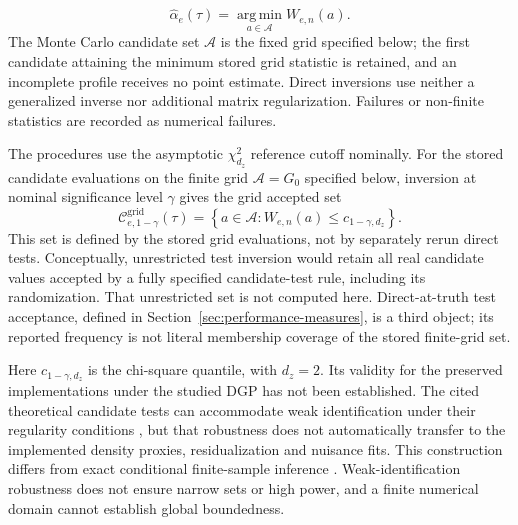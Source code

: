 \begin{equation}
    \widehat\alpha_e(\tau)
    =
    \operatorname*{arg\,min}_{a\in\mathcal A}W_{e,n}(a).
    \label{eq:gmm-point-estimator}
\end{equation}
The Monte Carlo candidate set $\mathcal A$ is the fixed grid specified below; the first candidate attaining the minimum stored grid statistic is retained, and an incomplete profile receives no point estimate. Direct inversions use neither a generalized inverse nor additional matrix regularization. Failures or non-finite statistics are recorded as numerical failures.

The procedures use the asymptotic $\chi^2_{d_z}$ reference cutoff nominally. For the stored candidate evaluations on the finite grid $\mathcal A=G_0$ specified below, inversion at nominal significance level $\gamma$ gives the grid accepted set
\begin{equation}
    \mathcal C^{\mathrm{grid}}_{e,1-\gamma}(\tau)
    =
    \left\{
        a\in\mathcal A:
        W_{e,n}(a)\leq c_{1-\gamma,d_z}
    \right\}.
    \label{eq:robust-confidence-region}
\end{equation}
This set is defined by the stored grid evaluations, not by separately rerun direct tests. Conceptually, unrestricted test inversion would retain all real candidate values accepted by a fully specified candidate-test rule, including its randomization. That unrestricted set is not computed here. Direct-at-truth test acceptance, defined in Section~\ref{sec:performance-measures}, is a third object; its reported frequency is not literal membership coverage of the stored finite-grid set.

Here $c_{1-\gamma,d_z}$ is the chi-square quantile, with $d_z=2$. Its validity for the preserved implementations under the studied DGP has not been established. The cited theoretical candidate tests can accommodate weak identification under their regularity conditions \parencite{chernozhukov_hansen_2008}, but that robustness does not automatically transfer to the implemented density proxies, residualization and nuisance fits. This construction differs from exact conditional finite-sample inference \parencite{chernozhukov_hansen_jansson_2009}. Weak-identification robustness does not ensure narrow sets or high power, and a finite numerical domain cannot establish global boundedness.
